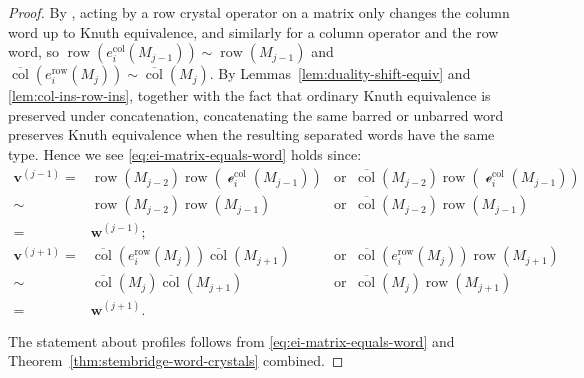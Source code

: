 \documentclass[12pt]{amsart}
\newcommand{\bs}{\boldsymbol}
\DeclareMathOperator{\worde}{{\mathcal e}}
\theoremstyle{definition}
\theoremstyle{remark}
\begin{document}
\begin{proof}
By \cite[Lemma~4.29]{AAA}, acting by a row crystal operator on a matrix only changes the column word up to Knuth equivalence, and similarly for a column operator and the row word, so 
$\operatorname{row}(e_i^{\mathrm{col}}(M_{j-1})) \sim \operatorname{row}(M_{j-1})$ and
$\overline{\operatorname{col}}(e_i^{\mathrm{row}}(M_j)) \sim \overline{\operatorname{col}}(M_j)$. 
By Lemmas~\ref{lem:duality-shift-equiv} and
\ref{lem:col-ins-row-ins}, together with the fact
that ordinary Knuth equivalence is preserved under concatenation,
concatenating the same barred or unbarred word preserves Knuth
equivalence when the resulting separated words have the same type.
Hence we see \eqref{eq:ei-matrix-equals-word} holds since:
 \begin{eqnarray}\nonumber
 {\bs v}^{(j-1)}  = &   \operatorname{row}(M_{j-2})\operatorname{row}(\worde_i^{\mathrm{col}}(M_{j-1})) &  \text{or} \;\; \overline{\operatorname{col}}(M_{j-2})\operatorname{row}(\worde_i^{\mathrm{col}}(M_{j-1}))\\ \nonumber
   \sim &  \operatorname{row}(M_{j-2})\operatorname{row}(M_{j-1})  & \text{or} \;\; \overline{\operatorname{col}}(M_{j-2})\operatorname{row}(M_{j-1})\\ \nonumber
    = &  {\bs w}^{(j-1)}; & \ \\ \nonumber
 {\bs v}^{(j+1)} = & \overline{{\operatorname{col}}}(e_i^{\mathrm{row}}(M_j))\overline{{\operatorname{col}}}(M_{j+1}) & \text{or} \;\; \overline{{\operatorname{col}}}(e_i^{\mathrm{row}}(M_j))\operatorname{row}(M_{j+1})\\ \nonumber
  \sim & \overline{{\operatorname{col}}}(M_j)\overline{{\operatorname{col}}}(M_{j+1}) & \text{or} \;\; \overline{{\operatorname{col}}}(M_j)\operatorname{row}(M_{j+1})\\
   = & {\bs w}^{(j+1)}. & \ \nonumber
 \end{eqnarray}

The statement about profiles follows from \eqref{eq:ei-matrix-equals-word} and 
Theorem~\ref{thm:stembridge-word-crystals} combined.
\end{proof}
\end{document}
